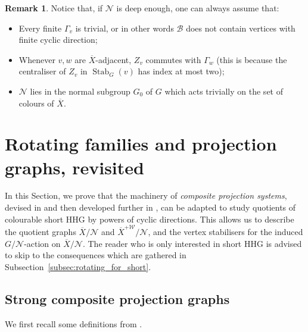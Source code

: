 \documentclass[svgnames]{amsart}
\theoremstyle{plain}
\theoremstyle{definition}
\newtheorem{rem}[thm]{Remark}
\newcommand{\ov}[1]{\overline{#1}}
\newcommand{\Stab}[2]{\operatorname{Stab}_{#1}(#2)}
\newcommand{\N}{\mathcal{N}}
\newcommand{\B}{\mathcal{B}}
\newcommand{\W}{\mathcal{W}}
\begin{document}
\begin{rem}\label{rem:initial_D}
    Notice that, if $\N$ is deep enough, one can always assume that:
    \begin{itemize}
        \item Every finite $\Gamma_v$ is trivial, or in other words $\B$ does not contain vertices with finite cyclic direction;
        \item Whenever $v,w$ are $\ov{X}$-adjacent, $Z_v$ commutes with $\Gamma_w$ (this is because the centraliser of $Z_v$ in $\Stab{G}{v}$ has index at most two);
        \item $\N$ lies in the normal subgroup $G_0$ of $G$ which acts trivially on the set of colours of $\ov X$.
    \end{itemize} 
\end{rem}




\section{Rotating families and projection graphs, revisited}\label{sec:rotating}
In this Section, we prove that the machinery of \emph{composite projection systems}, devised in \cite{dahmani:rotating} and then developed further in \cite{dfdt}, can be adapted to study quotients of colourable short HHG by powers of cyclic directions. This allows us to describe the quotient graphs $\ov X/\N$ and $\ov X^{+\W}/\N$, and the vertex stabilisers for the induced $G/\N$-action on $\ov X/\N$. The reader who is only interested in short HHG is advised to skip to the consequences which are gathered in Subsection~\ref{subsec:rotating_for_short}. 

\subsection{Strong composite projection graphs}\label{subsec:SCPG}
We first recall some definitions from \cite{dahmani:rotating}.
\end{document}
